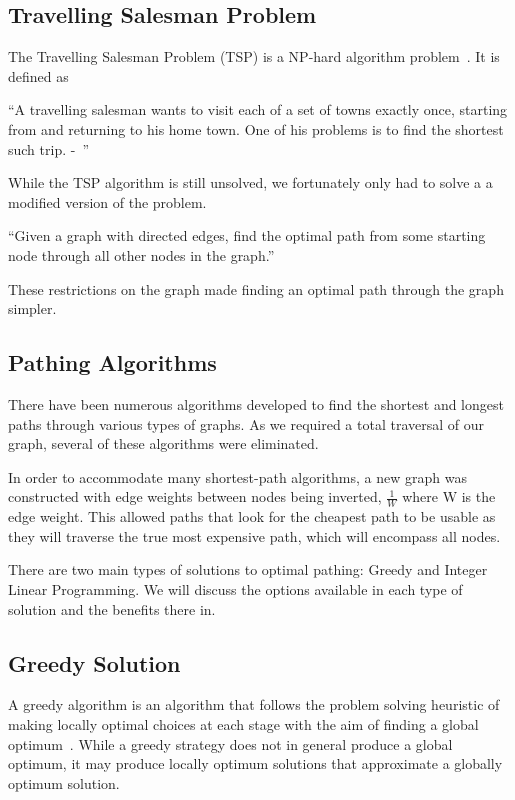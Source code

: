 \documentclass[bsc,frontabs,twoside,singlespacing,parskip,deptreport]{infthesis}     %
\begin{document}
\subsection{Travelling Salesman Problem}
The Travelling Salesman Problem (TSP) is a  NP-hard algorithm problem~\cite{junger1995traveling}.%
It is defined as
\begin{center}
\enquote{A travelling salesman wants to visit each of a set of towns exactly once, starting
from and returning to his home town. One of his problems is to find the shortest
such trip. -~\cite{junger1995traveling}}
\end{center}

While the TSP algorithm is still unsolved, we fortunately only had to solve a a modified version of the problem.\\

\begin{center}
  \enquote{Given a graph with directed edges, find the optimal path from some starting node through all other nodes in
  the graph.}
\end{center}

These restrictions on the graph made finding an optimal path through the graph simpler.


\subsection{Pathing Algorithms}
There have been numerous algorithms developed to find the shortest and longest paths through various types of graphs.
As we required a total traversal of our graph, several of these algorithms were eliminated.

In order to accommodate many shortest-path algorithms, a new graph was constructed with edge weights between nodes being inverted,
$\frac{1}{W}$ where W is the edge weight. This allowed paths that look for the cheapest path to be usable as they will traverse the
true most expensive path, which will encompass all nodes.

There are two main types of solutions to optimal pathing: Greedy and Integer Linear Programming.
We will discuss the options available in each type of solution and the benefits there in.

\subsection{Greedy Solution}
A greedy algorithm is an algorithm that follows the problem solving heuristic of making locally optimal choices at each stage with the aim
of finding a global optimum~\cite{black2004dictionary}.
While a greedy strategy does not in general produce a global optimum, it may produce locally optimum solutions that approximate a globally optimum solution.
\end{document}
